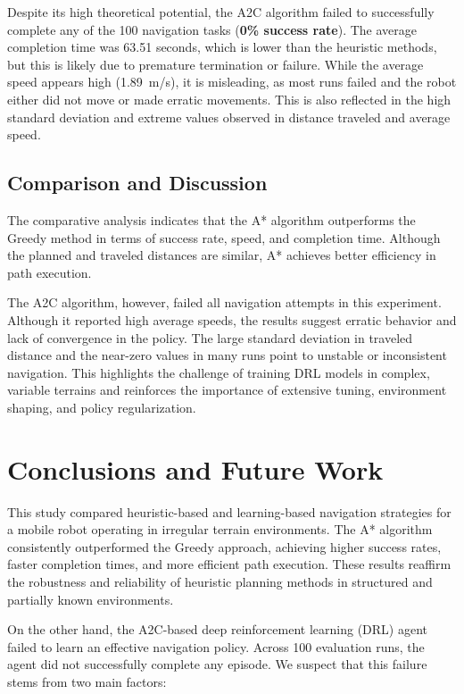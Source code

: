 \documentclass[conference]{IEEEtran}
\begin{document}
Despite its high theoretical potential, the A2C algorithm failed to successfully complete any of the 100 navigation tasks (\textbf{0\% success rate}). The average completion time was 63.51 seconds, which is lower than the heuristic methods, but this is likely due to premature termination or failure. While the average speed appears high (1.89~m/s), it is misleading, as most runs failed and the robot either did not move or made erratic movements. This is also reflected in the high standard deviation and extreme values observed in distance traveled and average speed.

\subsection{Comparison and Discussion}

The comparative analysis indicates that the A* algorithm outperforms the Greedy method in terms of success rate, speed, and completion time. Although the planned and traveled distances are similar, A* achieves better efficiency in path execution.

The A2C algorithm, however, failed all navigation attempts in this experiment. Although it reported high average speeds, the results suggest erratic behavior and lack of convergence in the policy. The large standard deviation in traveled distance and the near-zero values in many runs point to unstable or inconsistent navigation. This highlights the challenge of training DRL models in complex, variable terrains and reinforces the importance of extensive tuning, environment shaping, and policy regularization.


\section{Conclusions and Future Work}

This study compared heuristic-based and learning-based navigation strategies for a mobile robot operating in irregular terrain environments. The A* algorithm consistently outperformed the Greedy approach, achieving higher success rates, faster completion times, and more efficient path execution. These results reaffirm the robustness and reliability of heuristic planning methods in structured and partially known environments.

On the other hand, the A2C-based deep reinforcement learning (DRL) agent failed to learn an effective navigation policy. Across 100 evaluation runs, the agent did not successfully complete any episode. We suspect that this failure stems from two main factors:
\end{document}
